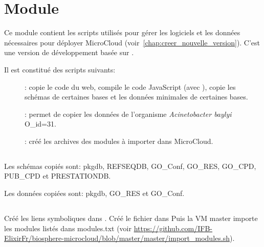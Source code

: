 \chapter{Module \micWEBdeployVer}


Ce module contient les scripts utilisés pour gérer les logiciels et les données nécessaires pour déployer MicroCloud (voir~\autoref{chap:creer_nouvelle_version}).
C'est une version de développement basée sur .

Il est constitué des scripts suivants:
\begin{description}
	\item[]: copie le code du web, compile le code JavaScript (avec ), copie les schémas de certaines bases et les données minimales de certaines bases.
	\item[]: permet de copier les données de l'organisme \textit{Acinetobacter baylyi} O\_id=31. 
	\item[]: créé les archives des modules à importer dans MicroCloud.
\end{description}

\section{}

Les schémas copiés sont: pkgdb, REFSEQDB, GO\_Conf, GO\_RES, GO\_CPD, PUB\_CPD et PRESTATIONDB.

Les données copiées sont: pkgdb, GO\_RES et GO\_Conf.

\section{}

Créé les liens symboliques dans .
\newline
Créé le fichier  dans 
\newline
Puis la VM master importe les modules listés dans modules.txt (voir \url{https://github.com/IFB-ElixirFr/biosphere-microcloud/blob/master/master/import_modules.sh}).

